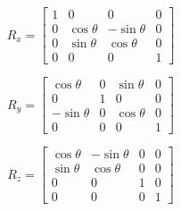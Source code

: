 \documentclass[13pt]{letter}
\begin{document}
\begin{enumerate}
	$$R_x = \left[
	\begin {array}{cccc}
	1 & 0           & 0           & 0 \\
	0 & \cos\theta  & -\sin\theta & 0 \\
	0 & \sin\theta  & \cos\theta  & 0 \\
	0 & 0           & 0           & 1
	\end {array}
	\right]$$
	
	$$R_y = \left[
	\begin {array}{cccc}
	\cos\theta  & 0 & \sin\theta  & 0 \\
	0           & 1 & 0           & 0 \\
	-\sin\theta & 0 & \cos\theta  & 0 \\
	0           & 0 & 0           & 1
	\end {array}
	\right]$$

	$$R_z = \left[
	\begin {array}{cccc}
	\cos\theta & -\sin\theta & 0 & 0 \\
	\sin\theta & \cos\theta  & 0 & 0 \\
	0          & 0           & 1 & 0 \\
	0          & 0           & 0 & 1
	\end {array}
	\right]$$


\end{enumerate}
\end{document}
